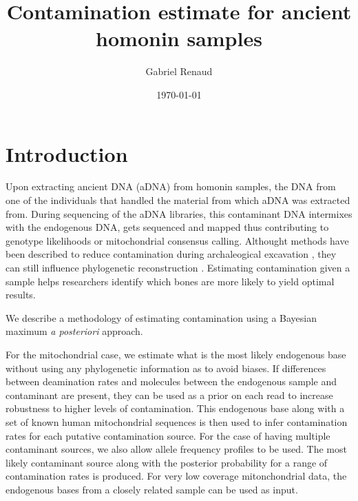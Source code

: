 \documentclass[a4paper,12pt]{article}
\begin{document}


\title{Contamination estimate for ancient homonin samples}
\date{\today}
\author{Gabriel Renaud}


\maketitle

\section{Introduction}

Upon extracting ancient DNA (aDNA) from homonin samples, the DNA from one of the individuals that handled the material from which aDNA was extracted from. During sequencing of the aDNA libraries, this contaminant DNA intermixes with the endogenous DNA, gets sequenced and mapped thus contributing to genotype likelihoods or mitochondrial consensus calling. Althought methods have been described to reduce contamination during archaleogical excavation \cite{yang2005contamination}, they can still influence phylogenetic reconstruction \cite{wall2007inconsistencies}. Estimating contamination given a sample helps researchers identify which bones are more likely to yield optimal results.



We describe a methodology of estimating contamination using a Bayesian maximum {\it a posteriori} approach.  

For the mitochondrial case, we estimate what is the most likely endogenous base without using any phylogenetic information as to avoid biases. If differences between deamination rates and molecules between the endogenous sample and contaminant are present, they can be used as a prior on each read to increase robustness to higher levels of contamination. This endogenous base along with a set of known human mitochondrial sequences is then used to infer contamination rates for each putative contamination source. For the case of having multiple contaminant sources, we also allow allele frequency profiles to be used. The most likely contaminant source along with the posterior probability for a range of contamination rates is produced. For very low coverage mitonchondrial data, the endogenous bases from a closely related sample can be used as input. 
\end{document}
